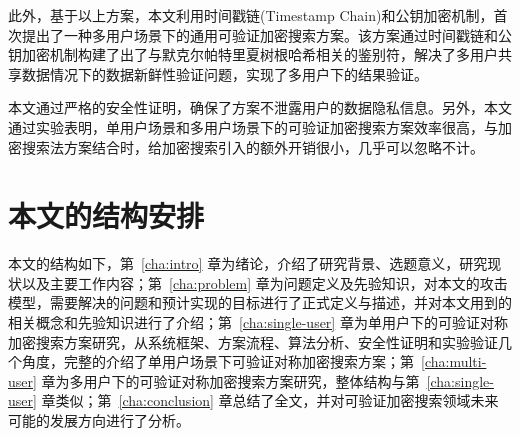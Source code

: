 此外，基于以上方案，本文利用时间戳链(Timestamp Chain)和公钥加密机制，首次提出了一种多用户场景下的通用可验证加密搜索方案。该方案通过时间戳链和公钥加密机制构建了出了与默克尔帕特里夏树根哈希相关的鉴别符，解决了多用户共享数据情况下的数据新鲜性验证问题，实现了多用户下的结果验证。

本文通过严格的安全性证明，确保了方案不泄露用户的数据隐私信息。另外，本文通过实验表明，单用户场景和多用户场景下的可验证加密搜索方案效率很高，与加密搜索法方案结合时，给加密搜索引入的额外开销很小，几乎可以忽略不计。


\section{本文的结构安排}
本文的结构如下，第~\ref{cha:intro} 章为绪论，介绍了研究背景、选题意义，研究现状以及主要工作内容；第~\ref{cha:problem} 章为问题定义及先验知识，对本文的攻击模型，需要解决的问题和预计实现的目标进行了正式定义与描述，并对本文用到的相关概念和先验知识进行了介绍；第~\ref{cha:single-user} 章为单用户下的可验证对称加密搜索方案研究，从系统框架、方案流程、算法分析、安全性证明和实验验证几个角度，完整的介绍了单用户场景下可验证对称加密搜索方案；第~\ref{cha:multi-user} 章为多用户下的可验证对称加密搜索方案研究，整体结构与第~\ref{cha:single-user} 章类似；第~\ref{cha:conclusion} 章总结了全文，并对可验证加密搜索领域未来可能的发展方向进行了分析。
